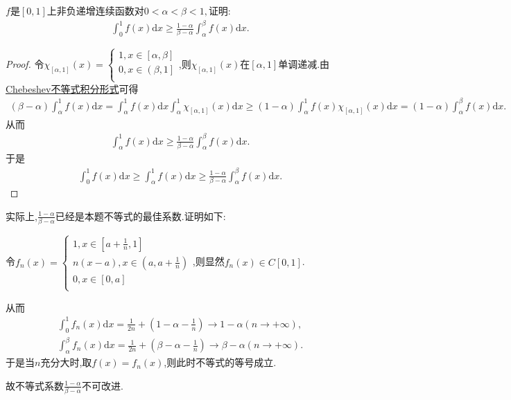 \documentclass[lang=cn,newtx,10pt,scheme=chinese]{../Template/elegantbook}
\begin{document}
\begin{example}
$f$是$[0,1]$上非负递增连续函数对$0 < \alpha < \beta < 1,$证明:
\begin{gather}
\int_{0}^{1} f(x) \mathrm{d}x \geqslant  \frac{1 - \alpha}{\beta - \alpha} \int_{\alpha}^{\beta} f(x) \mathrm{d}x.
\nonumber
\end{gather}
\end{example}
\begin{proof}
令$\chi _{\left[ \alpha ,1 \right]}\left( x \right) =\begin{cases}
1,x\in \left[ \alpha ,\beta \right]\\
0,x\in \left( \beta ,1 \right]\\
\end{cases}$,则$\chi _{\left[ \alpha ,1 \right]}\left( x \right)$在$[\alpha,1]$单调递减.由\hyperref[Basis of Analytics-Chebeshev不等式积分形式]{Chebeshev不等式积分形式}可得
\begin{align*}
\left( \beta -\alpha \right) \int_{\alpha}^1{f(x)\mathrm{d}x}=\int_{\alpha}^1{f(x)\mathrm{d}x\int_{\alpha}^1{\chi _{\left[ \alpha ,1 \right]}\left( x \right) \mathrm{d}x}}\geqslant \left( 1-\alpha \right) \int_{\alpha}^1{f\left( x \right) \chi _{\left[ \alpha ,1 \right]}\left( x \right) \mathrm{d}x}=\left( 1-\alpha \right) \int_{\alpha}^{\beta}{f\left( x \right) \mathrm{d}x}.
\nonumber
\end{align*}
从而
\begin{align*}
\int_{\alpha}^1{f(x)\mathrm{d}x}\geqslant \frac{1-\alpha}{\beta -\alpha}\int_{\alpha}^{\beta}{f\left( x \right) \mathrm{d}x}.
\nonumber
\end{align*}
于是
\begin{align*}
\int_0^1{f(x)\mathrm{d}x}\geqslant \int_{\alpha}^1{f(x)\mathrm{d}x}\geqslant \frac{1-\alpha}{\beta -\alpha}\int_{\alpha}^{\beta}{f\left( x \right) \mathrm{d}x}.
\nonumber
\end{align*}
\end{proof}
\begin{remark}
实际上,$\frac{1-\alpha}{\beta -\alpha}$已经是本题不等式的最佳系数.证明如下:

令$f_n\left( x \right) =\begin{cases}
1,x\in \left[ a+\frac{1}{n},1 \right]\\
n\left( x-a \right) ,x\in \left( a,a+\frac{1}{n} \right)\\
0,x\in \left[ 0,a \right]\\
\end{cases}$,则显然$f_n(x)\in C[0,1]$.

从而
\begin{align*}
\int_0^1{f_n\left( x \right) \mathrm{d}x}=\frac{1}{2n}+\left( 1-\alpha -\frac{1}{n} \right) \rightarrow 1-\alpha \left( n\rightarrow +\infty \right) ,
\\
\int_{\alpha}^{\beta}{f_n\left( x \right) \mathrm{d}x}=\frac{1}{2n}+\left( \beta -\alpha -\frac{1}{n} \right) \rightarrow \beta -\alpha \left( n\rightarrow +\infty \right) .
\nonumber
\end{align*}
于是当$n$充分大时,取$f(x)=f_n(x)$,则此时不等式的等号成立.

故不等式系数$\frac{1-\alpha}{\beta -\alpha}$不可改进.
\end{remark}
\end{document}
